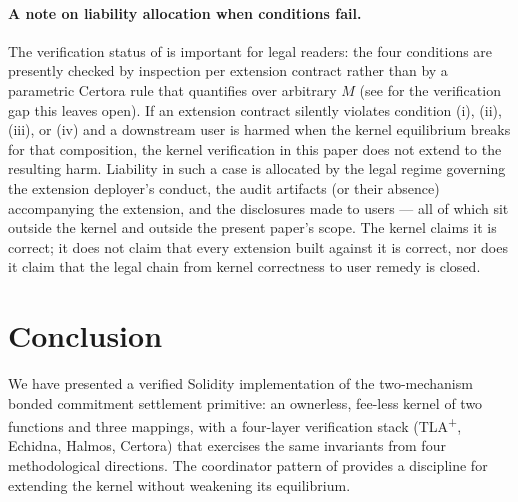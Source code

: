 \documentclass[11pt,a4paper]{article}
\theoremstyle{definition}
\theoremstyle{remark}
\begin{document}
\paragraph{A note on liability allocation when conditions fail.}
The verification status of  is important
for legal readers: the four conditions are presently checked by
inspection per extension contract rather than by a parametric
Certora rule that quantifies over arbitrary $M$ (see
 for the verification gap this leaves open).
If an extension contract silently violates condition (i), (ii),
(iii), or (iv) and a downstream user is harmed when the kernel
equilibrium breaks for that composition, the kernel verification
in this paper does not extend to the resulting harm. Liability in
such a case is allocated by the legal regime governing the
extension deployer's conduct, the audit artifacts (or their
absence) accompanying the extension, and the disclosures made to
users --- all of which sit outside the kernel and outside the
present paper's scope. The kernel claims it is correct; it does
not claim that every extension built against it is correct, nor
does it claim that the legal chain from kernel correctness to
user remedy is closed.

\section{Conclusion}
\label{sec:conclusion}

We have presented a verified Solidity implementation of the
two-mechanism bonded commitment settlement primitive: an ownerless,
fee-less kernel of two functions and three mappings, with a
four-layer verification stack (TLA\textsuperscript{+}, Echidna,
Halmos, Certora) that exercises the same invariants from four
methodological directions. The coordinator pattern of
 provides a discipline for extending the
kernel without weakening its equilibrium.
\end{document}
